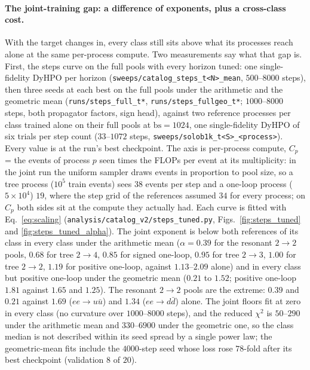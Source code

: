 \documentclass[11pt]{article}
\newcommand{\code}[1]{\texttt{#1}}
\begin{document}
\paragraph{The joint-training gap: a difference of exponents, plus a cross-class cost.}
With the target changes in, every class still sits above what its processes reach alone at
the same per-process compute. Two measurements say what that gap is. First, the steps curve on
the full pools with every horizon tuned: one single-fidelity DyHPO per horizon
(\code{sweeps/catalog\_steps\_t<N>\_mean}, $500$--$8000$ steps), then three seeds at each best on
the full pools under the arithmetic and the geometric mean (\code{runs/steps\_full\_t*},
\code{runs/steps\_fullgeo\_t*}; $1000$--$8000$ steps, both propagator factors, sign head), against
two reference processes per class trained alone on their full pools at $\mathrm{bs}=1024$, one
single-fidelity DyHPO of six trials per step count ($33$--$1072$ steps,
\code{sweeps/solob1k\_t<S>\_<process>}). Every value is at the run's best checkpoint. The axis is
per-process compute, $C_p$ = the events of process $p$ seen times the FLOPs per event at its
multiplicity: in the joint run the uniform sampler draws events in proportion to pool size, so a
tree process ($10^5$ train events) sees $38$ events per step and a one-loop process
($5\times10^4$) $19$, where the step grid of the references assumed $34$ for every process; on
$C_p$ both sides sit at the compute they actually had. Each curve is fitted with
Eq.~\eqref{eq:scaling} (\code{analysis/catalog\_v2/steps\_tuned.py},
Figs.~\ref{fig:steps_tuned} and \ref{fig:steps_tuned_alpha}). The joint exponent is below both
references of its class in every class under the arithmetic mean ($\alpha=0.39$ for the resonant
$2\to2$ pools, $0.68$ for tree $2\to4$, $0.85$ for signed one-loop, $0.95$ for tree $2\to3$, $1.00$
for tree $2\to2$, $1.19$ for positive one-loop, against $1.13$--$2.09$ alone) and in every class
but positive one-loop under the geometric mean ($0.21$ to $1.52$; positive one-loop $1.81$ against
$1.65$ and $1.25$). The resonant $2\to2$ pools are the extreme: $0.39$ and $0.21$ against $1.69$
($ee\to u\bar u$) and $1.34$ ($ee\to d\bar d$) alone. The joint floors fit at zero in every class
(no curvature over $1000$--$8000$ steps), and the reduced $\chi^2$ is $50$--$290$ under the
arithmetic mean and $330$--$6900$ under the geometric one, so the class median is not described
within its seed spread by a single power law; the geometric-mean fits include the
$4000$-step seed whose loss rose $78$-fold after its best checkpoint (validation $8$ of $20$).
\end{document}
